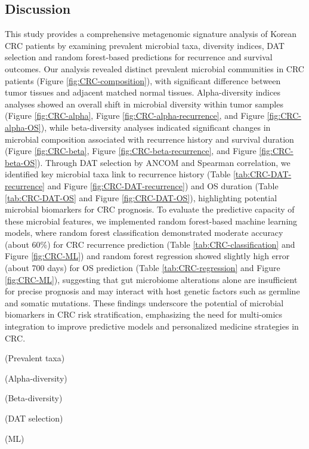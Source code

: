 \documentclass[11pt, a4paper, onecolumn, oneside]{report}
\begin{document}
        \subsection{Discussion}
            This study provides a comprehensive metagenomic signature analysis of Korean CRC patients by examining prevalent microbial taxa, diversity indices, DAT selection and random forest-based predictions for recurrence and survival outcomes. Our analysis revealed distinct prevalent microbial communities in CRC patients (Figure \ref{fig:CRC-composition}), with significant difference between tumor tissues and adjacent matched normal tissues. Alpha-diversity indices analyses showed an overall shift in microbial diversity within tumor samples (Figure \ref{fig:CRC-alpha}, Figure \ref{fig:CRC-alpha-recurrence}, and Figure \ref{fig:CRC-alpha-OS}), while beta-diversity analyses indicated significant changes in microbial composition associated with recurrence history and survival duration (Figure \ref{fig:CRC-beta}, Figure \ref{fig:CRC-beta-recurrence}, and Figure \ref{fig:CRC-beta-OS}). Through DAT selection by ANCOM and Spearman correlation, we identified key microbial taxa link to recurrence history (Table \ref{tab:CRC-DAT-recurrence} and Figure \ref{fig:CRC-DAT-recurrence}) and OS duration (Table \ref{tab:CRC-DAT-OS} and Figure \ref{fig:CRC-DAT-OS}), highlighting potential microbial biomarkers for CRC prognosis. To evaluate the predictive capacity of these microbial features, we implemented random forest-based machine learning models, where random forest classification demonstrated moderate accuracy (about 60\%) for CRC recurrence prediction (Table \ref{tab:CRC-classification} and Figure \ref{fig:CRC-ML}) and random forest regression showed slightly high error (about 700 days) for OS prediction (Table \ref{tab:CRC-regression} and Figure \ref{fig:CRC-ML}), suggesting that gut microbiome alterations alone are insufficient for precise prognosis and may interact with host genetic factors such as germline and somatic mutations. These findings underscore the potential of microbial biomarkers in CRC risk stratification, emphasizing the need for multi-omics integration to improve predictive models and personalized medicine strategies in CRC.

            (Prevalent taxa)

            (Alpha-diversity)

            (Beta-diversity)

            (DAT selection)

            (ML)
        \clearpage
    \newpage
\end{document}
